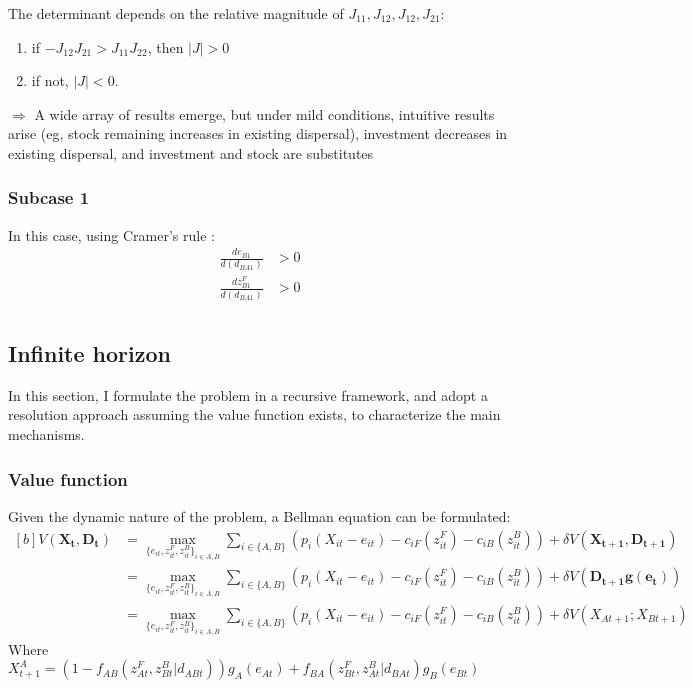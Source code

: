 \documentclass{article}
\begin{document}
The determinant depends on the relative magnitude of $J_{11}, J_{12},J_{12}, J_{21}$:
 \begin{enumerate}
 \item if $-J_{12}J_{21}>J_{11}J_{22}$, then $|J|>0$
 \item if not, $|J|<0$. 
 \end{enumerate}
$\Rightarrow$ A wide array of results emerge, but under mild conditions, intuitive results arise (eg, stock remaining increases in existing dispersal), investment decreases in existing dispersal, and investment and stock are substitutes

\subsubsection{Subcase 1}
In this case, using Cramer's rule : 
\begin{align*}
\frac{de_{B1}}{d(d_{BA1})} &>0\\
\frac{dz_{B1}^F}{d(d_{BA1})} & >0 \\ 
\end{align*}

\subsection{Infinite horizon}
In this section, I formulate the problem in a recursive framework, and adopt a resolution approach assuming the value function exists, to characterize the main mechanisms. 
\subsubsection{Value function}
Given the dynamic nature of the problem, a Bellman equation can be formulated: 
\begin{equation}
\begin{aligned}[b]
V(\mathbf{X_t,D_t}) &= \max_{ \{e_{it}, z_{it}^F, z_{it}^B\}_{i \in A,B} } \sum_{i \in \{A,B\}} \left( p_i(X_{it} - e_{it}) - c_{iF}(z_{it}^F) - c_{iB}(z_{it}^B) \right)+ \delta V\left(\mathbf{X_{t+1}, D_{t+1}}\right)\\
& = \max_{ \{e_{it}, z_{it}^F, z_{it}^B\}_{i \in A,B} } \sum_{i \in \{A,B\}} \left(p_i(X_{it} - e_{it}) - c_{iF}(z_{it}^F) - c_{iB}(z_{it}^B) \right) + \delta V(\mathbf{D_{t+1}g(e_t)})\\
&= \max_{ \{e_{it}, z_{it}^F, z_{it}^B\}_{i \in A,B} } \sum_{i \in \{A,B\}} \left( p_i(X_{it} - e_{it}) - c_{iF}(z_{it}^F) - c_{iB}(z_{it}^B)\right) + \delta V\left(X_{At+1}; X_{Bt+1} \right)
\end{aligned}
\end{equation}
Where $X_{t+1}^A = (1-f_{AB}(z^F_{At}, z^B_{Bt}| d_{ABt}))g_A(e_{At})+f_{BA}(z^F_{Bt}, z^B_{At}| d_{BAt})g_B(e_{Bt})$\\
\end{document}
